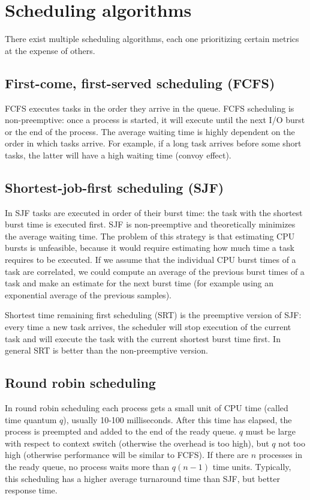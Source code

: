 \section{Scheduling algorithms}
There exist multiple scheduling algorithms, each one prioritizing certain metrics at the expense of others.
\subsection{First-come, first-served scheduling (FCFS)}
FCFS executes tasks in the order they arrive in the queue. FCFS scheduling is non-preemptive: once a process is started, it will execute until the next I/O burst or the end of the process. The average waiting time is highly dependent on the order in which tasks arrive. For example, if a long task arrives before some short tasks, the latter will have a high waiting time (convoy effect).
\subsection{Shortest-job-first scheduling (SJF)}
In SJF tasks are executed in order of their burst time: the task with the shortest burst time is executed first. SJF is non-preemptive and theoretically minimizes the average waiting time. The problem of this strategy is that estimating CPU bursts is unfeasible, because it would require estimating how much time a task requires to be executed. If we assume that the individual CPU burst times of a task are correlated, we could compute an average of the previous burst times of a task and make an estimate for the next burst time (for example using an exponential average of the previous samples).

Shortest time remaining first scheduling (SRT) is the preemptive version of SJF: every time a new task arrives, the scheduler will stop execution of the current task and will execute the task with the current shortest burst time first. In general SRT is better than the non-preemptive version.

\subsection{Round robin scheduling}
In round robin scheduling each process gets a small unit of CPU time (called time quantum $q$), usually 10-100 milliseconds. After this time has elapsed, the process is preempted and added to the end of the ready queue. $q$ must be large with respect to context switch (otherwise the overhead is too high), but $q$ not too high (otherwise performance will be similar to FCFS). If there are $n$ processes in the ready queue, no process waits more than $q(n-1)$ time units. Typically, this scheduling has a higher average turnaround time than SJF, but better response time.


